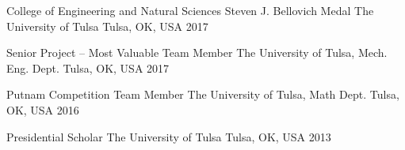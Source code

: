 \begin{cvhonors}

  \cvhonor
    {College of Engineering and Natural Sciences Steven J. Bellovich Medal} %
    {The University of Tulsa} %
    {Tulsa, OK, USA} %
    {2017} %


  \cvhonor
    {Senior Project -- Most Valuable Team Member} %
    {The University of Tulsa, Mech. Eng. Dept.} %
    {Tulsa, OK, USA} %
    {2017} %
    
\cvhonor
	{Putnam Competition Team Member} %
	{The University of Tulsa, Math Dept.} %
	{Tulsa, OK, USA} %
	{2016} %



    
\cvhonor
	{Presidential Scholar} %
	{The University of Tulsa} %
	{Tulsa, OK, USA} %
	{2013} %
\end{cvhonors}


